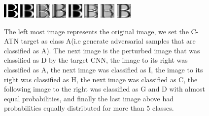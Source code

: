 \documentclass[12pt, conference, letterpaper]{IEEEtran}
\begin{document}
{{{{{{{{{{{{{{\begin{figure}[h]
\includegraphics[scale=1.0]{pictures/original.png}
\includegraphics[scale=1.0]{pictures/class_as_D.png}
\includegraphics[scale=1.0]{pictures/class_as_A.png}
\includegraphics[scale=1.0]{pictures/class_as_I.png}
\includegraphics[scale=1.0]{pictures/class_as_H.png}
\includegraphics[scale=1.0]{pictures/class_as_C.png}
\includegraphics[scale=1.0]{pictures/class_as_G_and_D.png}
\includegraphics[scale=1.0]{pictures/evenly_distributed.png}



\caption{The left most image represents the original image, we set the C-ATN target as class A(i.e generate adversarial samples that are classified as A). The next image is the perturbed image that was classified as D by the target CNN, the image to its right was classified as A, the next image was classified as I, the image to its right was classified as H, the next image was classified as C, the following image to the right was classified as G and D with almost equal probabilities, and finally the last image above had probabilities equally distributed for more than 5 classes.  }
\end{figure} 

}}}}}}}}}}}}}}
\end{document}
